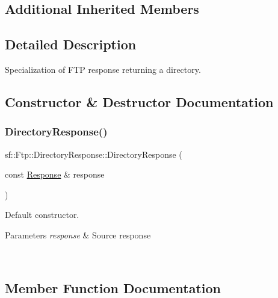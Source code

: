 \subsection*{Additional Inherited Members}


\subsection{Detailed Description}
Specialization of F\+TP response returning a directory. 

\begin{DoxyVerb}\end{DoxyVerb}
 

\subsection{Constructor \& Destructor Documentation}
\mbox{\label{classsf_1_1_ftp_1_1_directory_response_a36b6d2728fa53c4ad37b7a6307f4d388}} 
\subsubsection{\texorpdfstring{DirectoryResponse()}{DirectoryResponse()}}
{\footnotesize\ttfamily sf\+::\+Ftp\+::\+Directory\+Response\+::\+Directory\+Response (\begin{DoxyParamCaption}\item[{const \mbox{\hyperlink{classsf_1_1_ftp_1_1_response}{Response}} \&}]{response }\end{DoxyParamCaption})}



Default constructor. 


\begin{DoxyParams}{Parameters}
{\em response} & Source response \begin{DoxyVerb}\end{DoxyVerb}
 \\
\hline
\end{DoxyParams}


\subsection{Member Function Documentation}
\mbox{\label{classsf_1_1_ftp_1_1_directory_response_a311575c5c50905219025acfa73de67e2}} 
